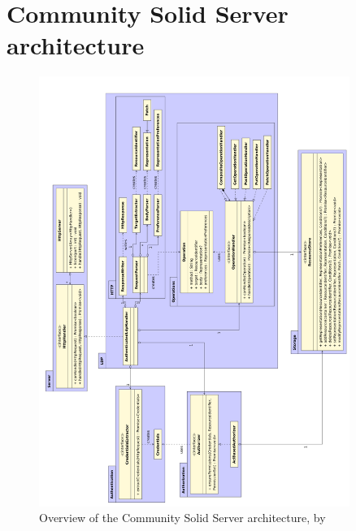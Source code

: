 \section{Community Solid Server architecture}
\label{appendix:css-architecture}
\begin{figure}[h]
   \centering
   \includegraphics[width =0.9\textwidth]{appendices/solid-architecture/solid-architecture-v1-3-0-overview.pdf}
 \caption{Overview of the Community Solid Server architecture, by \citet{solid-diagram}}
 \label{fig:solid-arch}
\end{figure}
